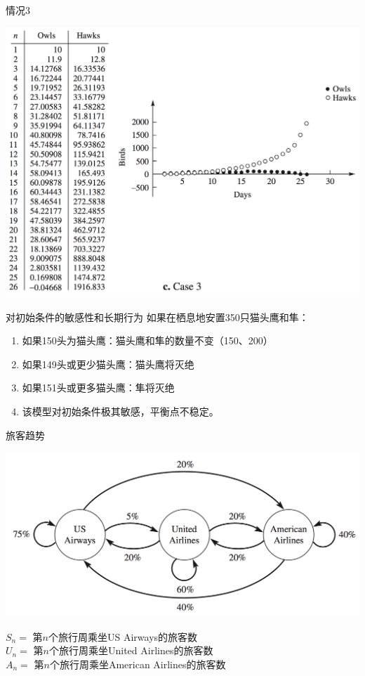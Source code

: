 \documentclass[UTF8, mathserif]{ctexbeamer}
\begin{document}
\begin{frame}{情况3}
  \begin{center}
    \includegraphics[height=.9\textheight{}]{owl-3.png}
  \end{center}  
\end{frame}

\begin{frame}{对初始条件的敏感性和长期行为}
  如果在栖息地安置350只猫头鹰和隼：

  \begin{enumerate}
  \item<1-> 如果150头为猫头鹰：猫头鹰和隼的数量不变（150、200）
  \item<2-> 如果149头或更少猫头鹰：猫头鹰将灭绝
  \item<3-> 如果151头或更多猫头鹰：隼将灭绝
  \item<4-> 该模型对初始条件极其敏感，平衡点不稳定。
  \end{enumerate}

\end{frame}

\begin{frame}{旅客趋势}
  \begin{center}
    \includegraphics[width=.6\textwidth{}]{party.png}
  \end{center}  
  
  \begin{definition}
    $S_n = $ 第$n$个旅行周乘坐US Airways的旅客数\\
    $U_n = $ 第$n$个旅行周乘坐United Airlines的旅客数\\
    $A_n = $ 第$n$个旅行周乘坐American Airlines的旅客数
  \end{definition}
  
\end{frame}
\end{document}
